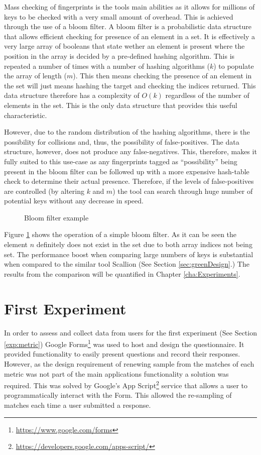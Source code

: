 Mass checking of fingerprints is the tools main abilities as it allows for millions of keys to be checked with a very small amount of overhead. This is achieved through the use of a bloom filter. A bloom filter is a probabilistic data structure that allows efficient checking for presence of an element in a set. It is effectively a very large array of booleans that state wether an element is present where the position in the array is decided by a pre-defined hashing algorithm. This is repeated a number of times with a number of hashing algorithms ($k$) to populate the array of length ($m$). This then means checking the presence of an element in the set will just means hashing the target and checking the indices returned. This data structure therefore has a complexity of $O(k)$ regardless of the number of elements in the set. This is the only data structure that provides this useful characteristic.

However, due to the random distribution of the hashing algorithms, there is the possibility for collisions and, thus, the possibility of false-positives. The data structure, however, does not produce any false-negatives. This, therefore, makes it fully suited to this use-case as any fingerprints tagged as ``possibility'' being present in the bloom filter can be followed up with a more expensive hash-table check to determine their actual presence. Therefore, if the levels of false-positives are controlled (by altering $k$ and $m$) the tool can search through huge number of potential keys without any decrease in speed.

\begin{figure}[h!]
    \centering
    
    \caption{Bloom filter example}
    \label{fig:bloom}
\end{figure}

Figure \ref{fig:bloom} shows the operation of a simple bloom filter. As it can be seen the element $n$ definitely does not exist in the set due to both array indices not being set. The performance boost when comparing large numbers of keys is substantial when compared to the similar tool Scallion (See Section \ref{sec:greenDesign}.) The results from the comparison will be quantified in Chapter \ref{cha:Experiments}.

\section{First Experiment}
In order to assess and collect data from users for the first experiment (See Section \ref{exp:metric}) Google Forms\footnote{\url{https://www.google.com/forms}} was used to host and design the questionnaire. It provided functionality to easily present questions and record their responses. However, as the design requirement of renewing sample from the matches of each metric was not part of the main applications functionality a solution was required. This was solved by Google's App Script\footnote{\url{https://developers.google.com/apps-script/}} service that allows a user to programmatically interact with the Form. This allowed the re-sampling of matches each time a user submitted a response.

